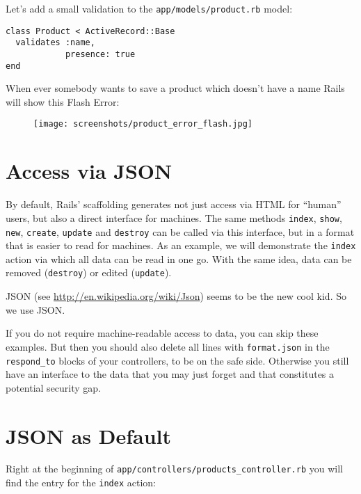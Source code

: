 \documentclass[a4paper]{book}
\begin{document}
Let's add a small validation to the \texttt{app/models/product.rb} model:

\begin{shaded}\begin{verbatim}
class Product < ActiveRecord::Base
  validates :name,
            presence: true
end
\end{verbatim}\end{shaded}

When ever somebody wants to save a product which doesn't have a name Rails will show this Flash Error:

\begin{figure}[htbp]
\centering
\texttt{[image: screenshots/product\_error\_flash.jpg]}
\end{figure}

\section{Access via JSON}\label{access-via-json}

By default, Rails' scaffolding generates not just access via HTML for “human” users, but also a direct interface for machines. The same methods \texttt{index}, \texttt{show}, \texttt{new}, \texttt{create}, \texttt{update} and \texttt{destroy} can be called via this interface, but in a format that is easier to read for machines. As an example, we will demonstrate the \texttt{index} action via which all data can be read in one go. With the same idea, data can be removed (\texttt{destroy}) or edited (\texttt{update}).

JSON (see \href{http://de.wikipedia.org/wiki/JavaScript_Object_Notation}{http://en.wikipedia.org/wiki/Json}) seems to be the new cool kid. So we use JSON.

If you do not require machine-readable access to data, you can skip these examples. But then you should also delete all lines with \texttt{format.json} in the \texttt{respond\_to} blocks of your controllers, to be on the safe side. Otherwise you still have an interface to the data that you may just forget and that constitutes a potential security gap.

\section{JSON as Default}\label{json-as-default}

Right at the beginning of \texttt{app/controllers/products\_controller.rb} you will find the entry for the \texttt{index} action:
\end{document}
